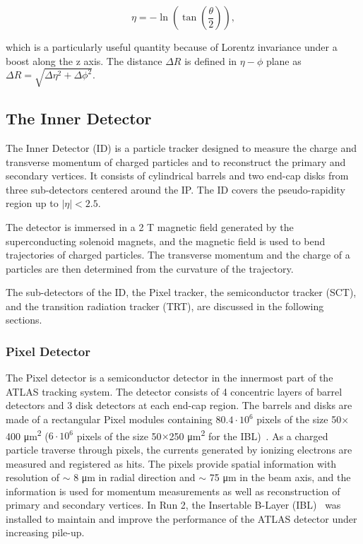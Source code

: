 \begin{equation}
    \label{eq:eta}
    \eta = -\ln (\tan (\frac{\theta}{2})),
\end{equation}

which is a particularly useful quantity because of Lorentz invariance under a boost along the z axis. The distance $\Delta R$ is defined in $\eta-\phi$ plane as $\Delta R = \sqrt{\Delta \eta^{2} + \Delta \phi^{2}}$.

\subsection{The Inner Detector}
\label{sec:atlas:id}
The Inner Detector (ID) is a particle tracker designed to measure the charge and transverse momentum of charged particles and to reconstruct the primary and secondary vertices. It consists of cylindrical barrels and two end-cap disks from three sub-detectors centered around the IP. The ID covers the pseudo-rapidity region up to $|\eta| < 2.5$. 

The detector is immersed  in a 2 T magnetic field generated by the superconducting solenoid magnets, and the magnetic field is used to bend trajectories of charged particles. The transverse momentum and the charge of a particles are then determined from the curvature of the trajectory.

The sub-detectors of the ID, the Pixel tracker, the semiconductor tracker (SCT), and the transition radiation tracker (TRT), are discussed in the following sections.

\subsubsection{Pixel Detector}
\label{sec:atlas:pixel}

The Pixel detector is a semiconductor detector in the innermost part of the ATLAS tracking system. The detector consists of 4 concentric layers of barrel detectors and 3 disk detectors at each end-cap region. The barrels and disks are made of a rectangular Pixel modules containing $80.4\cdot10^{6}$ pixels of the size 50$\times$400 \si{\micro\meter^{2}} ($6\cdot10^{6}$ pixels of the size 50$\times$250 \si{\micro\meter^{2}} for the IBL)~\cite{1748-0221-10-06-C06012}. As a charged particle traverse through pixels, the currents generated by ionizing electrons are measured and registered as hits. The pixels provide spatial information with resolution of $\sim$ 8 \si{\micro\meter} in radial direction and $\sim$ 75 \si{\micro\meter} in the beam axis, and the information is used for momentum measurements as well as reconstruction of primary and secondary vertices. In Run 2, the Insertable B-Layer (IBL)~\cite{2011NIMPA.650...45H} was installed to maintain and improve the performance of the ATLAS detector under increasing pile-up.

